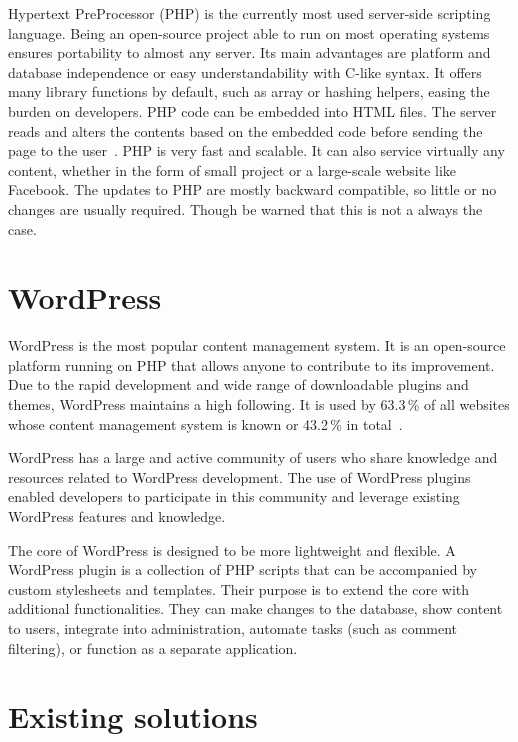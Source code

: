 \documentclass[
  digital,     %
  oneside,     %
  nosansbold,  %
  colorbold, %
  lof,         %
  lot,         %
]{fithesis4}
\begin{document}
Hypertext PreProcessor (PHP) is the currently most used \mbox{server-side} scripting
language. Being an \mbox{open-source} project able to run on most operating systems
ensures portability to almost any server. Its main advantages are platform and database
independence or easy understandability with \mbox{C-like} syntax. It offers many
library functions by default, such as array or hashing helpers, easing the burden
on developers. PHP code can be embedded into HTML files. The server reads and
alters the contents based on the embedded code before sending the page to the
user~\parencite[page.~30]{welling17}. PHP is very fast and scalable. It can also service
virtually any content, whether in the form of small project or a \mbox{large-scale}
website like Facebook. The updates to PHP are mostly backward compatible, so little
or no changes are usually required. Though be warned that this is not a always the case.

\section{WordPress}
\label{sect:wordpress}

WordPress is the most popular content management system. It is an \mbox{open-source}
platform running on PHP that allows anyone to contribute to its improvement.
Due to the rapid development and wide range of downloadable plugins and themes,
WordPress maintains a high following. It is used by 63.3\,\% of all websites whose
content management system is known or 43.2\,\% in total~\cite{w3_wordpress}.

WordPress has a large and active community of users who share knowledge and
resources related to WordPress development. The use of WordPress plugins
enabled developers to participate in this community and leverage existing
WordPress features and knowledge.

The core of WordPress is designed to be more lightweight and flexible. A WordPress
plugin is a collection of PHP scripts that can be accompanied by custom stylesheets
and templates. Their purpose is to extend the core with additional functionalities.
They can make changes to the database, show content to users, integrate into
administration, automate tasks (such as comment filtering), or function as
a separate application.

\section{Existing solutions}
\end{document}
